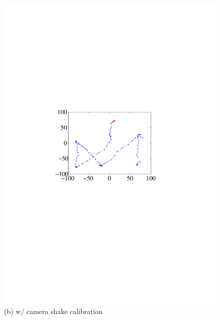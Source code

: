 \begin{figure}[!t]
{\begin{minipage}[b]{0.24\textwidth}
            \includegraphics[width=\textwidth]{fig/5-2.pdf}\\
            \centering \footnotesize (b) w/ camera shake calibration
            \end{minipage}
        }
        \hfill
\end{figure}
